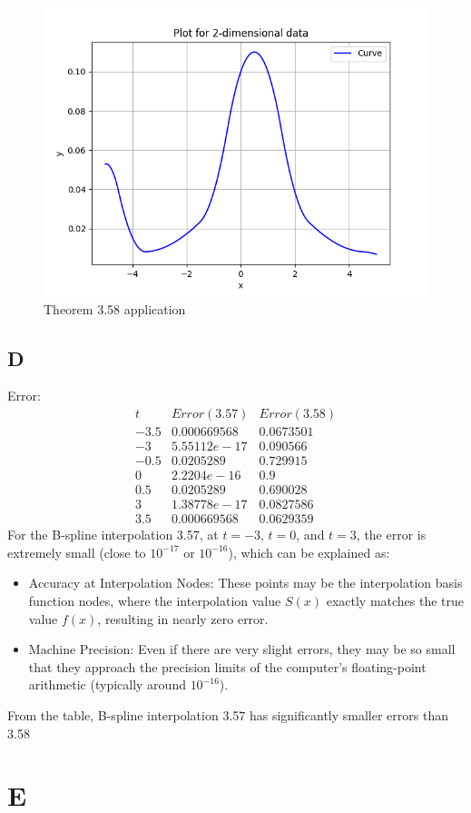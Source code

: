 \documentclass[a4paper]{article}
\begin{document}
\begin{figure}
    \centering
    \includegraphics[width=0.5\linewidth]{../figure/C_358.png}
    \caption{Theorem 3.58 application}
\end{figure}
\subsection*{D}
Error:
\[
\begin{array}{c|cc}
    t & Error(3.57) & Error(3.58) \\
    -3.5 & 	0.000669568 &	0.0673501\\
    -3 & 5.55112e-17 &0.090566\\
    -0.5 & 	0.0205289 &	0.729915\\
    0 & 2.2204e-16 &0.9\\
    0.5&	0.0205289&	0.690028\\
    3&1.38778e-17&0.0827586\\
    3.5&	0.000669568&	0.0629359
\end{array}
\]
For the B-spline interpolation 3.57, at \( t = -3 \), \( t = 0 \), and \( t = 3 \), the error is extremely small (close to \( 10^{-17} \) or \( 10^{-16} \)), which can be explained as:
\begin{itemize}
    \item Accuracy at Interpolation Nodes: These points may be the interpolation basis function nodes, where the interpolation value \( S(x) \) exactly matches the true value \( f(x) \), resulting in nearly zero error.
    \item Machine Precision: Even if there are very slight errors, they may be so small that they approach the precision limits of the computer's floating-point arithmetic (typically around \( 10^{-16} \)).
\end{itemize}

From the table, B-spline interpolation 3.57 has significantly smaller errors than 3.58
  

\section*{E}
\end{document}
